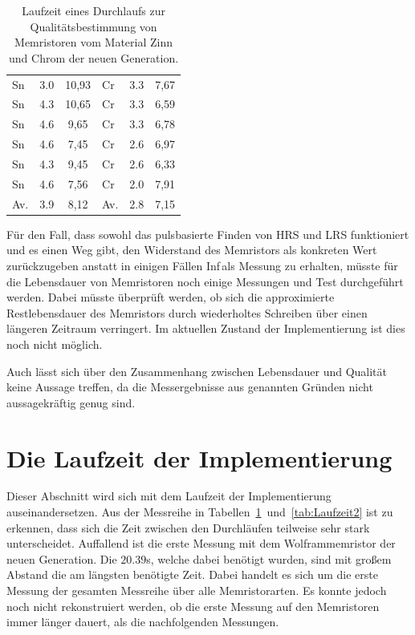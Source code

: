 \begin{table}
\begin{tabular}{l|c|c||l|c|c}
      Sn            & 3.0           & 10,93                & Cr            & 3.3           & 7,67     \\
      Sn            & 4.3           & 10,65                & Cr            & 3.3           & 6,59     \\
      Sn            & 4.6           & 9,65                 & Cr            & 3.3           & 6,78     \\
      Sn            & 4.6           & 7,45                 & Cr            & 2.6           & 6,97     \\
      Sn            & 4.3           & 9,45                 & Cr            & 2.6           & 6,33     \\
      Sn            & 4.6           & 7,56                 & Cr            & 2.0           & 7,91     \\
      Av.           & 3.9           & 8,12                 & Av.           & 2.8           & 7,15     \\
    \end{tabular}
  \caption{Laufzeit eines Durchlaufs zur Qualitätsbestimmung von Memristoren vom Material Zinn und Chrom der neuen Generation.}
  \label{tab:Laufzeit}
\end{table}

Für den Fall, dass sowohl das pulsbasierte Finden von HRS und LRS funktioniert und es einen Weg gibt, den Widerstand des Memristors als konkreten Wert zurückzugeben anstatt in einigen Fällen \glqq Inf\grqq\,als Messung zu erhalten, müsste für die Lebensdauer von Memristoren noch einige Messungen und Test durchgeführt werden. Dabei müsste überprüft werden, ob sich die approximierte Restlebensdauer des Memristors durch wiederholtes Schreiben über einen längeren Zeitraum verringert. Im aktuellen Zustand der Implementierung ist dies noch nicht möglich.

Auch lässt sich über den Zusammenhang zwischen Lebensdauer und Qualität keine Aussage treffen, da die Messergebnisse aus genannten Gründen nicht aussagekräftig genug sind.

\section{Die Laufzeit der Implementierung}

Dieser Abschnitt wird sich mit dem Laufzeit der Implementierung auseinandersetzen. Aus der Messreihe in Tabellen~\ref{tab:Laufzeit}~und~\ref{tab:Laufzeit2} ist zu erkennen, dass sich die Zeit zwischen den Durchläufen teilweise sehr stark unterscheidet. Auffallend ist die erste Messung mit dem Wolframmemristor der neuen Generation. Die $20.39$s, welche dabei benötigt wurden, sind mit großem Abstand die am längsten benötigte Zeit. Dabei handelt es sich um die erste Messung der gesamten Messreihe über alle Memristorarten. Es konnte jedoch noch nicht rekonstruiert werden, ob die erste Messung auf den Memristoren immer länger dauert, als die nachfolgenden Messungen.


